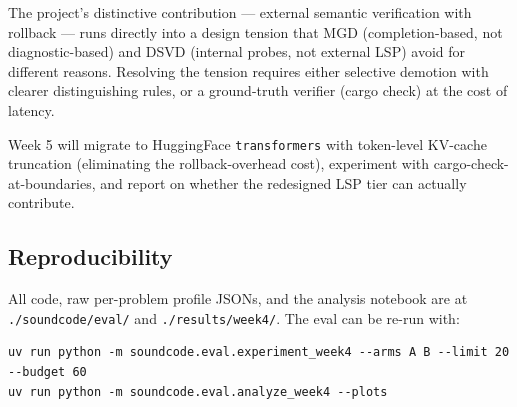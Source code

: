 \documentclass[11pt]{article}
\begin{document}
The project's distinctive contribution --- external semantic verification with rollback --- runs directly into a design tension that MGD (completion-based, not diagnostic-based) and DSVD (internal probes, not external LSP) avoid for different reasons. Resolving the tension requires either selective demotion with clearer distinguishing rules, or a ground-truth verifier (cargo check) at the cost of latency.

Week 5 will migrate to HuggingFace \texttt{transformers} with token-level KV-cache truncation (eliminating the rollback-overhead cost), experiment with cargo-check-at-boundaries, and report on whether the redesigned LSP tier can actually contribute.

\subsection*{Reproducibility}

All code, raw per-problem profile JSONs, and the analysis notebook are at \texttt{./soundcode/eval/} and \texttt{./results/week4/}. The eval can be re-run with:
\begin{lstlisting}
uv run python -m soundcode.eval.experiment_week4 --arms A B --limit 20 --budget 60
uv run python -m soundcode.eval.analyze_week4 --plots
\end{lstlisting}
\end{document}
